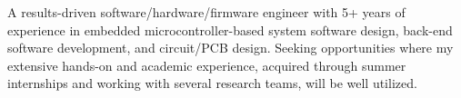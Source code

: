\cvsummary
{
  A results-driven software/hardware/firmware engineer with 5+ years of experience in embedded microcontroller-based system software design, back-end software development, and circuit/PCB design. Seeking opportunities where my extensive hands-on and academic experience, acquired through summer internships and working with several research teams, will be well utilized.
} 